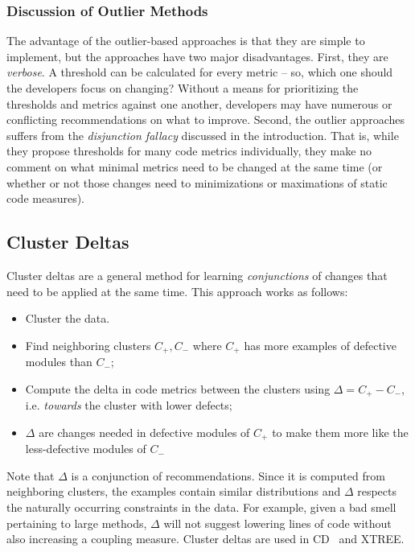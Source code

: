 \documentclass[twocolumn,5p]{elsarticle}
\theoremstyle{break}
\begin{document}
\subsubsection{Discussion of Outlier Methods}\label{sect:disc}
The advantage of the outlier-based
approaches is that they are simple to implement, but the approaches have   two  major disadvantages. 
First, they are {\em verbose}. A threshold can be calculated for every metric -- so, which one should the developers focus on changing? Without a means for prioritizing the  thresholds and metrics against one another, developers may have numerous or conflicting recommendations on what to improve. Second, the outlier approaches suffers from
the {\em disjunction fallacy}  discussed in the introduction.
That is, while
 they propose thresholds for many code metrics
individually, they make no comment on what minimal
metrics need to be changed at the same time (or whether or not those
changes need to minimizations or maximations of static code measures).



\subsection{Cluster Deltas}

Cluster deltas are a general method
for learning {\em conjunctions} of changes
that need to be applied at the same time. 
This approach works as follows:
\begin{itemize}
    \item Cluster the data. 
    \item Find
neighboring clusters $C_+,C_-$ where $C_+$ has more examples of defective
modules than $C_-$;
\item Compute the  delta   in code metrics between the clusters using \mbox{$\Delta = C_+ - C_-$}, i.e.
{\em towards} the cluster with lower defects;
\item $\Delta$ are changes needed in defective modules of $C_+$ to
      make them more like the less-defective modules of $C_-$
\end{itemize}
Note that $\Delta$ is a conjunction of  recommendations.
Since it is computed
from neighboring clusters, the examples contain similar distributions and $\Delta$ respects the naturally occurring constraints in the data. For example,
given a bad smell pertaining to large methods,   $\Delta$   will not  suggest lowering lines of code
without also increasing a coupling measure. 
Cluster deltas are used in CD~\cite{me12c} and XTREE.
\end{document}
